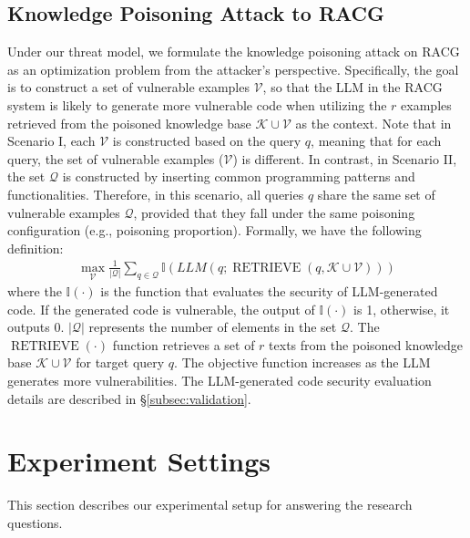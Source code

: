 \subsection{Knowledge Poisoning Attack to RACG}
\label{subsec:task_formulation}
Under our threat model, we formulate the knowledge poisoning attack on RACG as an optimization problem from the attacker's perspective.
Specifically, the goal is to construct a set of vulnerable examples $\mathcal{V}$, 
so that the LLM in the RACG system is likely to generate more vulnerable code when utilizing the $r$ examples retrieved from the poisoned knowledge base $\mathcal{K} \cup \mathcal{V}$ as the context.
Note that in Scenario I, each $\mathcal{V}$ is constructed based on the query $q$, meaning that for each query, the set of vulnerable examples ($\mathcal{V}$) is different. In contrast, in Scenario II, the set $\mathcal{Q}$ is constructed by inserting common programming patterns and functionalities. Therefore, in this scenario, all queries $q$ share the same set of vulnerable examples $\mathcal{Q}$, provided that they fall under the same poisoning configuration (e.g., poisoning proportion). Formally, we have the following definition:
\begin{equation*}
\begin{aligned}
    \max _{\mathcal{V}} \frac{1}{|\mathcal{Q}|} \sum_{q\in\mathcal{Q}} \mathbb{I}\left(LLM\left(q ; \operatorname{RETRIEVE}\left(q, \mathcal{K} \cup \mathcal{V}\right)\right)\right)
\end{aligned}
\end{equation*}
where the $\mathbb{I}(\cdot)$ is the function that evaluates the security of LLM-generated code. If the generated code is vulnerable, the output of $\mathbb{I}(\cdot)$ is 1, otherwise, it outputs 0. $|\mathcal{Q}|$ represents the number of elements in the set $\mathcal{Q}$. The $\operatorname{RETRIEVE}(\cdot)$ function retrieves a set of $r$ texts from the poisoned knowledge base $\mathcal{K} \cup \mathcal{V}$ for target query $q$. The objective function increases as the LLM generates more vulnerabilities. The LLM-generated code security evaluation details are described in \S\ref{subsec:validation}.


\section{Experiment Settings} 
\label{sec:exp_setting}
This section describes our experimental setup for answering the research questions. 

